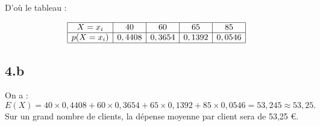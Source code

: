 	D'où le tableau :
	
	\[
	\begin{array}{|c|c|c|c|c|}
		\hline
		X = x_i & 40 & 60 & 65 & 85 \\
		\hline
		p(X = x_i) & 0,4408 & 0,3654 & 0,1392 & 0,0546 \\
		\hline
	\end{array}
	\]
	
	\subsection*{4.b}
	On a :
	\[
	E(X) = 40 \times 0,4408 + 60 \times 0,3654 + 65 \times 0,1392 + 85 \times 0,0546 = 53,245 \approx 53,25.
	\]
	Sur un grand nombre de clients, la dépense moyenne par client sera de 53,25 €.
